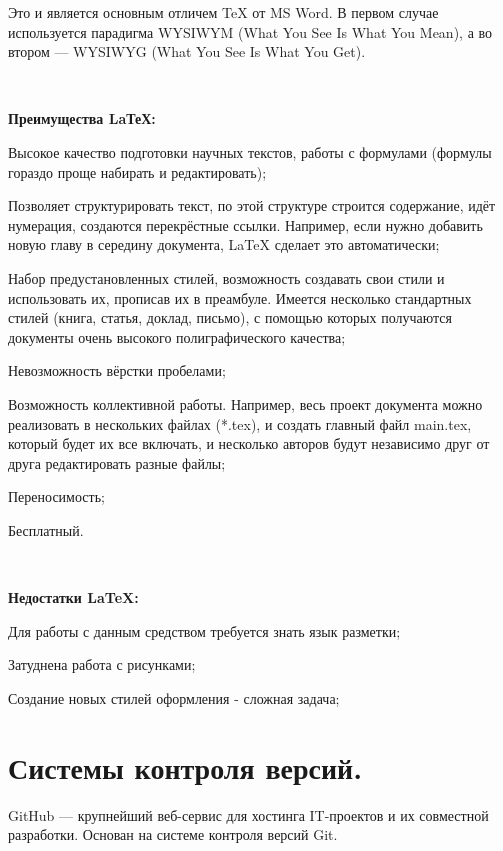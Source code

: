 \documentclass{article}
\begin{document}
Это и является основным отличем TeX от MS Word.
В первом случае используется парадигма WYSIWYM (What You See Is What You Mean), а во втором  — WYSIWYG (What You See Is What You Get).

~\

\textbf{Преимущества LaТеХ:}
\begin{compactitem}
\item Высокое качество подготовки научных текстов, работы с формулами (формулы гораздо проще набирать и редактировать);
\item Позволяет структурировать текст, по этой структуре строится содержание, идёт нумерация, создаются перекрёстные ссылки. Например, если нужно добавить новую главу в середину документа, LaTeX сделает это автоматически;
\item Набор предустановленных стилей, возможность создавать свои стили и использовать их, прописав их в преамбуле. Имеется несколько стандартных стилей (книга, статья, доклад, письмо), с помощью которых получаются документы очень высокого полиграфического качества;
\item Невозможность вёрстки пробелами;
\item Возможность коллективной работы. Например, весь проект документа можно реализовать в нескольких файлах (*.tex), и создать главный файл main.tex, который будет их все включать, и несколько авторов будут независимо друг от друга редактировать разные файлы;
\item Переносимость;
\item Бесплатный.


\end{compactitem}

~\

\textbf{Недостатки LaTeX:}
\begin{compactitem}
\item Для работы с данным средством требуется знать язык разметки;
\item Затуднена работа с рисунками;
\item Создание новых стилей оформления - сложная задача;


\end{compactitem}

\newpage

\section{\textbf{\large Системы контроля версий.}}

GitHub — крупнейший веб-сервис для хостинга IT-проектов и их совместной разработки. Основан на системе контроля версий Git.
\end{document}
